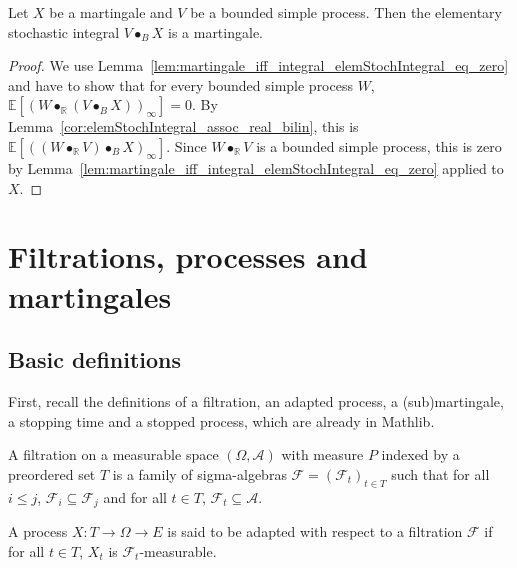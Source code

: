 \begin{lemma}\label{lem:Martingale.elemStochIntegral}
Let $X$ be a martingale and $V$ be a bounded simple process.
Then the elementary stochastic integral $V \bullet_B X$ is a martingale.
\end{lemma}

\begin{proof}
We use Lemma~\ref{lem:martingale_iff_integral_elemStochIntegral_eq_zero} and have to show that for every bounded simple process $W$, $\mathbb{E}[(W \bullet_{\mathbb{R}} (V \bullet_B X))_\infty] = 0$.
By Lemma~\ref{cor:elemStochIntegral_assoc_real_bilin}, this is $\mathbb{E}[((W \bullet_{\mathbb{R}} V) \bullet_B X)_\infty]$.
Since $W \bullet_{\mathbb{R}} V$ is a bounded simple process, this is zero by Lemma~\ref{lem:martingale_iff_integral_elemStochIntegral_eq_zero} applied to $X$.
\end{proof}


\chapter{{Filtrations, processes and martingales}}\label{chap:filtration_martingale}


\section{Basic definitions}

First, recall the definitions of a filtration, an adapted process, a (sub)martingale, a stopping time and a stopped process, which are already in Mathlib.


\begin{definition}[Filtration]\label{def:filtration}
  \mathlibok
A filtration on a measurable space $(\Omega, \mathcal{A})$ with measure $P$ indexed by a preordered set $T$ is a family of sigma-algebras $\mathcal{F} = (\mathcal{F}_t)_{t \in T}$ such that for all $i \le j$, $\mathcal{F}_i \subseteq \mathcal{F}_j$ and for all $t \in T$, $\mathcal{F}_t \subseteq \mathcal{A}$.
\end{definition}


\begin{definition}\label{def:adapted}
  \mathlibok
A process $X : T \to \Omega \to E$ is said to be adapted with respect to a filtration $\mathcal{F}$ if for all $t \in T$, $X_t$ is $\mathcal{F}_t$-measurable.
\end{definition}


